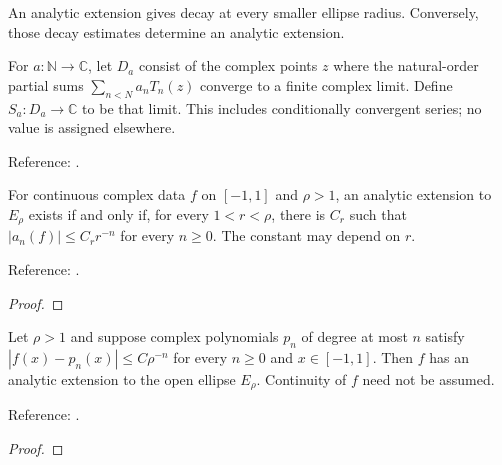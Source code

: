 An analytic extension gives decay at every smaller ellipse radius. Conversely, those decay estimates determine an analytic extension.

\begin{definition}
\label{def:complex-chebyshev-series}
\leanok
For $a:\mathbb N\to\mathbb C$, let $D_a$ consist of the complex points $z$
where the natural-order partial sums $\sum_{n<N}a_nT_n(z)$ converge to a finite
complex limit. Define $S_a:D_a\to\mathbb C$ to be that limit. This includes
conditionally convergent series; no value is assigned elsewhere.

Reference: \cite[Chapters 3 and 8]{atap}.
\end{definition}

\begin{theorem}
\label{thm:analytic-decay-characterization}
\leanok
For continuous complex data $f$ on $[-1,1]$ and $\rho>1$, an analytic
extension to $E_\rho$ exists if and only if, for every $1<r<\rho$, there is
$C_r$ such that $|a_n(f)|\le C_r r^{-n}$ for every $n\ge0$.
The constant may depend on $r$.

Reference: \cite[Theorems 8.1--8.3]{atap}.
\end{theorem}
\begin{proof}
\leanok
\end{proof}

\begin{theorem}
\label{thm:bernstein-converse}
\leanok
Let $\rho>1$ and suppose complex polynomials $p_n$ of degree at most $n$
satisfy $|f(x)-p_n(x)|\le C\rho^{-n}$ for every $n\ge0$ and $x\in[-1,1]$.
Then $f$ has an analytic extension to the open ellipse $E_\rho$.
Continuity of $f$ need not be assumed.

Reference: \cite[Theorem 8.3]{atap}.
\end{theorem}
\begin{proof}
\leanok
\end{proof}

